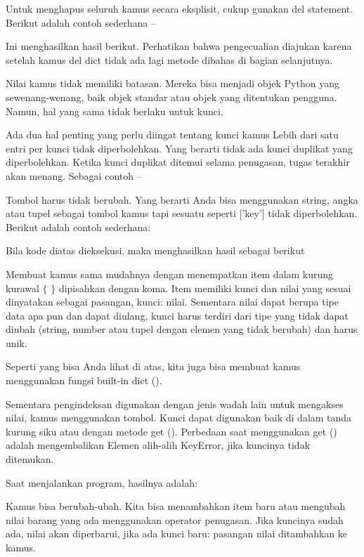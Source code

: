 Untuk menghapus seluruh kamus secara eksplisit, cukup gunakan del statement. Berikut adalah contoh sederhana – \par

Ini menghasilkan hasil berikut. Perhatikan bahwa pengecualian diajukan karena setelah kamus del dict tidak ada lagi metode dibahas di bagian selanjutnya. \par

Nilai kamus tidak memiliki batasan. Mereka bisa menjadi objek Python yang sewenang-wenang, baik objek standar atau objek yang ditentukan pengguna. Namun, hal yang sama tidak berlaku untuk kunci. \par
 
Ada dua hal penting yang perlu diingat tentang kunci kamus 
Lebih dari satu entri per kunci tidak diperbolehkan. Yang berarti tidak ada kunci duplikat yang diperbolehkan. Ketika kunci duplikat ditemui selama penugasan, tugas terakhir akan menang. Sebagai contoh – \par
Tombol harus tidak berubah. Yang berarti Anda bisa menggunakan string, angka atau tupel sebagai tombol kamus tapi sesuatu seperti ['key'] tidak diperbolehkan. Berikut adalah contoh sederhana: \par

Bila kode diatas dieksekusi, maka menghasilkan hasil sebagai berikut 

Membuat kamus sama mudahnya dengan menempatkan item dalam kurung kurawal  $  \{  $ $  \}  $ dipisahkan dengan koma. Item memiliki kunci dan nilai yang sesuai dinyatakan sebagai pasangan, kunci: nilai. Sementara nilai dapat berupa tipe data apa pun dan dapat diulang, kunci harus terdiri dari tipe yang tidak dapat diubah (string, number atau tupel dengan elemen yang tidak berubah) dan harus unik. \par

Seperti yang bisa Anda lihat di atas, kita juga bisa membuat kamus menggunakan fungsi built-in dict (). 

Sementara pengindeksan digunakan dengan jenis wadah lain untuk mengakses nilai, kamus menggunakan tombol. Kunci dapat digunakan baik di dalam tanda kurung siku atau dengan metode get (). Perbedaan saat menggunakan get () adalah mengembalikan Elemen alih-alih KeyError, jika kuncinya tidak ditemukan. \par

Saat menjalankan program, hasilnya adalah: 

Kamus bisa berubah-ubah. Kita bisa menambahkan item baru atau mengubah nilai barang yang ada menggunakan operator penugasan. 
Jika kuncinya sudah ada, nilai akan diperbarui, jika ada kunci baru: pasangan nilai ditambahkan ke kamus. 

